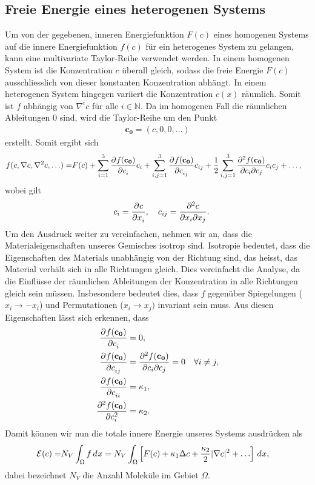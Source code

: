 \subsection{Freie Energie eines heterogenen Systems}
Um von der gegebenen, inneren Energiefunktion $F(c)$ eines homogenen Systems
auf die innere Energiefunktion $f(c)$ für ein heterogenes System zu gelangen,
kann eine multivariate Taylor-Reihe verwendet werden.
In einem homogenen System ist die Konzentration $c$ überall gleich,
sodass die freie Energie $F(c)$ ausschliesslich von dieser konstanten Konzentration abhängt.
In einem heterogenen System hingegen variiert die Konzentration $c(x)$ räumlich.
Somit ist $f$ abhängig von $\nabla^i c$ für alle $i \in \mathbb{N}$.
Da im homogenen Fall die räumlichen Ableitungen $0$ sind,
wird die Taylor-Reihe um den Punkt
\begin{align*}
\mathbf{c_0}
=
(c, 0, 0, \ldots)
\end{align*}
erstellt.
Somit ergibt sich
\begin{align*}
f(c, \nabla c, \nabla^2 c, \ldots)
=
& F(c)
+ \sum_{i=1}^3 \pderiv{f(\mathbf{c_0})}{c_i} c_i
+ \sum_{i,j=1}^3 \pderiv{f(\mathbf{c_0})}{c_{ij}} c_{ij}
+ \frac{1}{2} \sum_{i,j=1}^3 \frac{\partial^2 f(\mathbf{c_0})}{%
\partial c_i \partial c_j} c_{i} c_{j}
+ \ldots
,
\end{align*}
wobei gilt
\begin{align*}
\quad
c_i
=
\pderiv{c}{x_i}
,\quad
c_{ij}
=
\frac{\partial^2 c}{\partial x_i \partial x_j}
.
\end{align*}
Um den Ausdruck weiter zu vereinfachen,
nehmen wir an,
dass die Materialeigenschaften unseres Gemisches isotrop sind.
Isotropie bedeutet,
dass die Eigenschaften des Materials unabhängig von der Richtung sind,
das heisst,
das Material verhält sich in alle Richtungen gleich.
Dies vereinfacht die Analyse,
da die Einflüsse der räumlichen Ableitungen der Konzentration
in alle Richtungen gleich sein müssen.
Insbesondere bedeutet dies,
dass $f$ gegenüber Spiegelungen ($x_i \rightarrow -x_i$) und
Permutationen ($x_i \rightarrow x_j)$ invariant sein muss.
Aus diesen Eigenschaften lässt sich erkennen,
dass
\begin{align*}
\pderiv{f(\mathbf{c_0})}{c_i}
&=
0,
\\
\pderiv{f(\mathbf{c_0})}{c_{ij}}
&=
\frac{\partial^2 f(\mathbf{c_0})}{\partial c_i \partial c_j}
=
0
\quad \forall i \neq j,
\\
\pderiv{f(\mathbf{c_0})}{c_{ii}}
&=
\kappa_1,
\\
 \pderiv[2]{f(\mathbf{c_0})}{c_i}
&=
\kappa_2
.
\end{align*}
Damit können wir nun die totale innere Energie unseres Systems ausdrücken als
\begin{align}
\mathcal{E}(c)
=
&N_V \int_\Omega f\di{x}
=
N_V \int_\Omega \left[
F(c) + \kappa_1 \Delta c + \frac{\kappa_2}{2} |\nabla c|^2  + \ldots
\right]\di{x}
\label{cahnhilliard:energylong}
,
\end{align}
dabei bezeichnet $N_V$ die Anzahl Moleküle im Gebiet $\Omega$.

